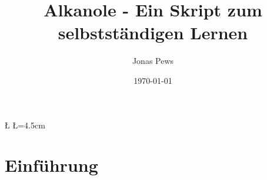 \documentclass{scrartcl}  %
\author{Jonas Pews}
\title{Alkanole - Ein Skript zum selbstständigen Lernen}
\date{\today}
\begin{document}
%
		
		\renewcommand{\D}{5} %
		\renewcommand{\U}{6} %
		\newdimen\R %
		\R=3.5cm 
		\newdimen\L %
		\L=4.5cm
		\renewcommand{\A}{360/\D} %



	\maketitle
	
	\begin{center}
		\ccbyncsa
	\end{center}
	

\pagebreak

	\tableofcontents

\pagebreak
	
		
		\section{Einführung}
	
\end{document}
